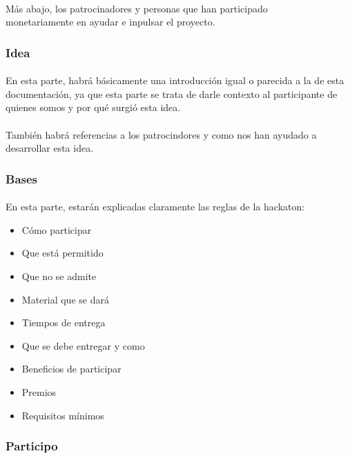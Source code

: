 \documentclass[a4paper]{article}
\begin{document}
    \paragraph{}
    Más abajo, los patrocinadores y personas que han participado\\ monetariamente 
    en ayudar e inpulsar el proyecto.
    \subsubsection[/idea]{Idea}
    \paragraph{}
    En esta parte, habrá básicamente una introducción igual o parecida a la 
    de esta documentación, ya que esta parte se trata de darle contexto al 
    participante de quienes somos y por qué surgió esta idea.
    \paragraph{}
    También habrá referencias a los patrocindores y como nos han ayudado a 
    desarrollar esta idea.
    \subsubsection[/bases]{Bases}
    \paragraph{}
    En esta parte, estarán explicadas claramente las reglas de 
    la hackaton:
    \begin{itemize}
        \item Cómo participar
        \item Que está permitido
        \item Que no se admite
        \item Material que se dará
        \item Tiempos de entrega
        \item Que se debe entregar y como 
        \item Beneficios de participar 
        \item Premios
        \item Requisitos mínimos
    \end{itemize}
    \subsubsection[/participo]{Participo}
\end{document}
